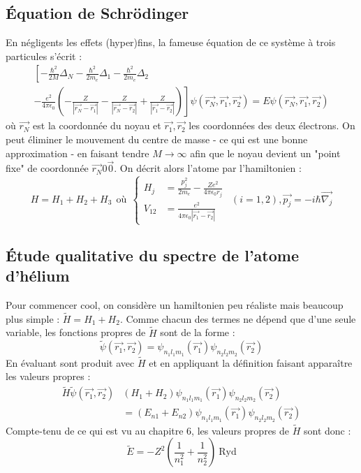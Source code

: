 \documentclass	[11pt, a4paper, openany]{book}
\begin{document}
    \subsection{Équation de Schrödinger}
    En négligents les effets (hyper)fins, la fameuse équation de ce système à trois 
    particules s'écrit :
    \begin{multline}
    \left[-\frac{\hbar^2}{2M}\Delta_N-\frac{\hbar^2}{2m_e}\Delta_1-\frac{\hbar^2}{2m_e}\Delta_2\right.\\
    \left.-\frac{e^2}{4\pi\epsilon_0} \left(-\frac{Z}{|\vec{r_N}-\vec{r_1}|}-\frac{Z}{|\vec{r_N}-
    \vec{r_2}|}+\frac{Z}{|\vec{r_1}-\vec{r_2}|}\right)\right]\psi(\vec{r_N},\vec{r_1},\vec{r_2}) = 
    E\psi(\vec{r_N},\vec{r_1},\vec{r_2})
    \end{multline}
	où $\vec{r_N}$ est la coordonnée du noyau et $\vec{r_1},\vec{r_2}$ les coordonnées 
	des deux électrons. On peut éliminer le mouvement du centre de masse - ce qui est
	une bonne approximation - en faisant tendre $M \rightarrow \infty$ afin que le 
	noyau devient un "point fixe" de coordonnée $\vec{r_N}0\vec{0}$. On décrit alors 
	l'atome par l'hamiltonien :
	\begin{equation}
	H = H_1+H_2+H_3\ \ \text{où}\ \ \left\{\begin{array}{ll}
	H_j &= \frac{p_j^2}{2m_e}-\frac{Ze^2}{4\pi\epsilon_0r_j}  \\
	V_{12} &= \frac{e^2}{4\pi\epsilon_0|\vec{r_1}-\vec{r_2}|} 
	\end{array}\right.\ \ (i=1,2), \vec{p_j}=-i\hbar\vec{\nabla_j}
	\end{equation}
	
	
	\subsection{Étude qualitative du spectre de l'atome d'hélium}
	Pour commencer cool, on considère un hamiltonien peu réaliste mais beaucoup plus
	simple : $\tilde{H} = H_1+H_2$. Comme chacun des termes ne dépend que d'une 
	seule variable, les fonctions propres de $\tilde{H}$ sont de la forme :
	\begin{equation}
	\tilde{\psi}(\vec{r_1},\vec{r_2}) = \psi_{n_1l_1m_1}(\vec{r_1})\psi_{n_2l_2m_2}(
	\vec{r_2})
	\end{equation}
	En évaluant sont produit avec $\tilde{H}$ et en appliquant la définition faisant
	apparaître les valeurs propres : 
	\begin{equation}
	\begin{array}{ll}
	\tilde{H}\tilde{\psi}(\vec{r_1},\vec{r_2}) & (H_1+H_2)\psi_{n_1l_1m_1}(\vec{r_1})
	\psi_{n_2l_2m_2}(\vec{r_2})\\
	 &= (E_{n1}+E_{n2})\psi_{n_1l_1m_1}(\vec{r_1})\psi_{n_2l_2m_2}(\vec{r_2})
	\end{array}
	\end{equation}
	Compte-tenu de ce qui est vu au chapitre 6, les valeurs propres de $\tilde{H}$ sont 
	donc :
	\begin{equation}
	\tilde{E} = -Z^2\left(\frac{1}{n_1^2}+\frac{1}{n_2^2}\right)\ \text{Ryd}
	\end{equation}
	
\end{document}
